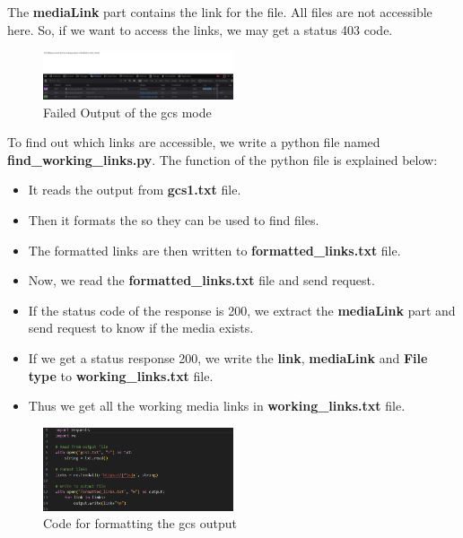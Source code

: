 \documentclass[12 pt]{article}
\begin{document}
\newline
The \textbf{mediaLink} part contains the link for the file. All files are not accessible here. So, if we want to access the links, we may get a status 403 code.
\begin{figure}[H]
    \centering
    \includegraphics[width=0.5\textwidth]{gcs_Output_Fail.png}
    \caption{Failed Output of the gcs mode}
    \label{fig: gcs Output Fail}
\end{figure}
To find out which links are accessible, we write a python file named \textbf{find\_working\_links.py}. The function of the python file is explained below:
\begin{itemize}
    \item It reads the output from \textbf{gcs1.txt} file.
    \item Then it formats the so they can be used to find files.
    \item The formatted links are then written to \textbf{formatted\_links.txt} file.
    \item Now, we read the \textbf{formatted\_links.txt} file and send request.
    \item If the status code of the response is 200, we extract the \textbf{mediaLink} part and send request to know if the media exists.
    \item If we get a status response 200, we write the \textbf{link}, \textbf{mediaLink} and \textbf{File type} to \textbf{working\_links.txt} file.
    \item Thus we get all the working media links in \textbf{working\_links.txt} file.
\end{itemize}
\begin{figure}[H]
    \centering
    \includegraphics[width=0.5\textwidth]{gcs_Output_Formatting_Code.png}
    \caption{Code for formatting the gcs output}
    \label{fig: gcs Output Formatting Code}
\end{figure}
\end{document}
